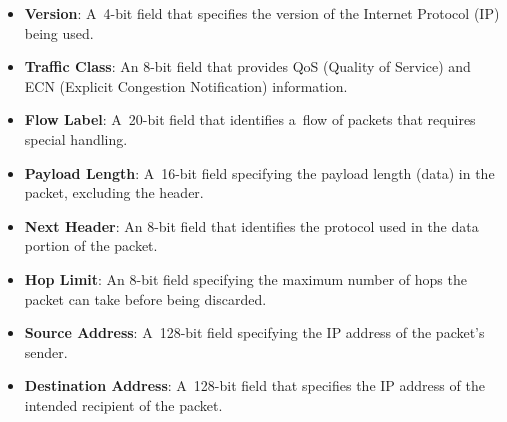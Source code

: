 \documentclass[
  printed,     %
  color,       %
  oneside,     %
  nosansbold,  %
  nocolorbold, %
  nolof,         %
  nolot,         %
]{fithesis4}
\begin{document}
\begin{itemize}[noitemsep,topsep=0pt]
    \item \textbf{Version}: A~4-bit field that specifies the version of the Internet Protocol (IP) being used.
    \item \textbf{Traffic Class}: An 8-bit field that provides QoS (Quality of Service) and ECN (Explicit Congestion Notification) information.
    \item \textbf{Flow Label}: A~20-bit field that identifies a~flow of packets that requires special handling.
    \item \textbf{Payload Length}: A~16-bit field specifying the payload length (data) in the packet, excluding the header.
    \item \textbf{Next Header}: An 8-bit field that identifies the protocol used in the data portion of the packet.
    \item \textbf{Hop Limit}: An 8-bit field specifying the maximum number of hops the packet can take before being discarded.
    \item \textbf{Source Address}: A~128-bit field specifying the IP address of the packet's sender.
    \item \textbf{Destination Address}: A~128-bit field that specifies the IP address of the intended recipient of the packet.
\end{itemize}
\end{document}
